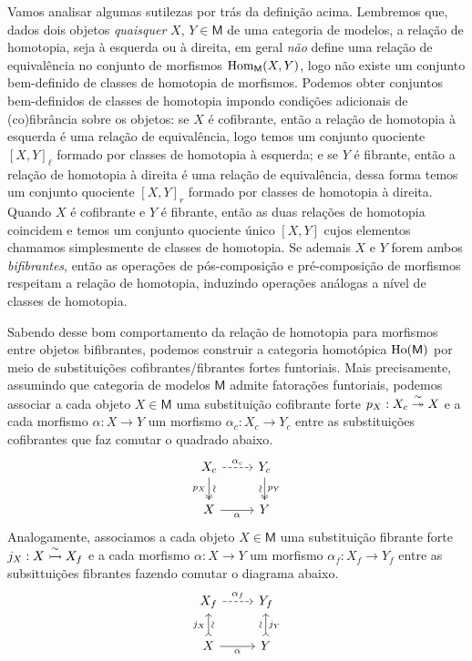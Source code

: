 Vamos analisar algumas sutilezas por trás da definição acima.
Lembremos que, dados dois objetos \emph{quaisquer} $X,\,Y \in \mathsf{M}$ de uma categoria de modelos, a relação de homotopia, seja à esquerda ou à direita, em geral \emph{não} define uma relação de equivalência no conjunto de morfismos $\mathrm{Hom}_{\mathsf{M}}(X,Y)$, logo não existe um conjunto bem-definido de classes de homotopia de morfismos.
Podemos obter conjuntos bem-definidos de classes de homotopia impondo condições adicionais de (co)fibrância sobre os objetos: se $X$ é cofibrante, então a relação de homotopia à esquerda é uma relação de equivalência, logo temos um conjunto quociente $[X,Y]_{\ell}$ formado por classes de homotopia à esquerda; e se $Y$ é fibrante, então a relação de homotopia à direita é uma relação de equivalência, dessa forma temos um conjunto quociente $[X,Y]_{r}$ formado por classes de homotopia à direita.
Quando $X$ é cofibrante e $Y$ é fibrante, então as duas relações de homotopia coincidem e temos um conjunto quociente único $[X,Y]$ cujos elementos chamamos simplesmente de classes de homotopia.
Se ademais $X$ e $Y$ forem ambos \emph{bifibrantes}, então as operações de pós-composição e pré-composição de morfismos respeitam a relação de homotopia, induzindo operações análogas a nível de classes de homotopia.

Sabendo desse bom comportamento da relação de homotopia para morfismos entre objetos bifibrantes, podemos construir a categoria homotópica $\mathrm{Ho}(\mathsf{M})$ por meio de substituições cofibrantes/fibrantes fortes funtoriais.
Mais precisamente, assumindo que categoria de modelos $\mathsf{M}$ admite fatorações funtoriais, podemos associar a cada objeto $X \in \mathsf{M}$ uma substituição cofibrante forte $p_{X}: X_{c} \overset{\sim}{\twoheadrightarrow} X$ e a cada morfismo $\alpha: X \to Y$ um morfismo $\alpha_{c}: X_{c} \to Y_{c}$ entre as substituições cofibrantes que faz comutar o quadrado abaixo.
\begin{displaymath}
  \begin{tikzcd}
    X_{c}
    \arrow[r, dashed, "\alpha_{c}"]
    \arrow[d, two heads, "\sim" {sloped}, "p_{X}" swap]
    & Y_{c}
    \arrow[d, two heads, "\sim" {swap,sloped}, "p_{Y}"]
    \\ X
    \arrow[r, "\alpha" swap]
    & Y
  \end{tikzcd}
\end{displaymath}
Analogamente, associamos a cada objeto $X \in \mathsf{M}$ uma substituição fibrante forte $j_{X}: X \overset{\sim}{\rightarrowtail} X_{f}$ e a cada morfismo $\alpha: X \to Y$ um morfismo $\alpha_{f}: X_{f} \to Y_{f}$ entre as subsittuições fibrantes fazendo comutar o diagrama abaixo.
\begin{displaymath}
  \begin{tikzcd}
    X_{f}
    \arrow[r, dashed, "\alpha_{f}"]
    & Y_{f}
    \\ X
    \arrow[u, tail, "j_{X}", "\sim" {swap,sloped}]
    \arrow[r, "\alpha" swap]
    & Y
    \arrow[u, tail, "\sim" {sloped}, "j_{Y}" {swap}]
  \end{tikzcd}
\end{displaymath}

